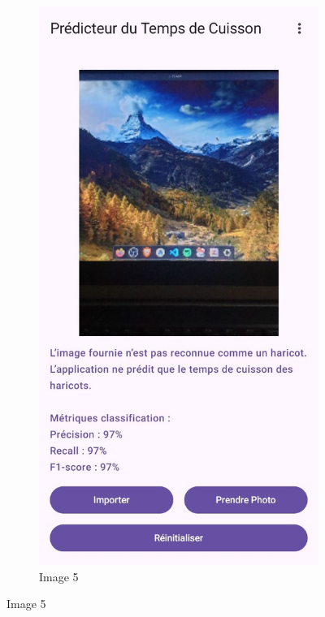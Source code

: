 \begin{figure}[H]
    \begin{subfigure}{0.24\textwidth}
        \centering
        \includegraphics[width=\linewidth]{figures/test5.jpg}
        \caption{Image 5}
    \end{subfigure}\hfill

\end{figure}
